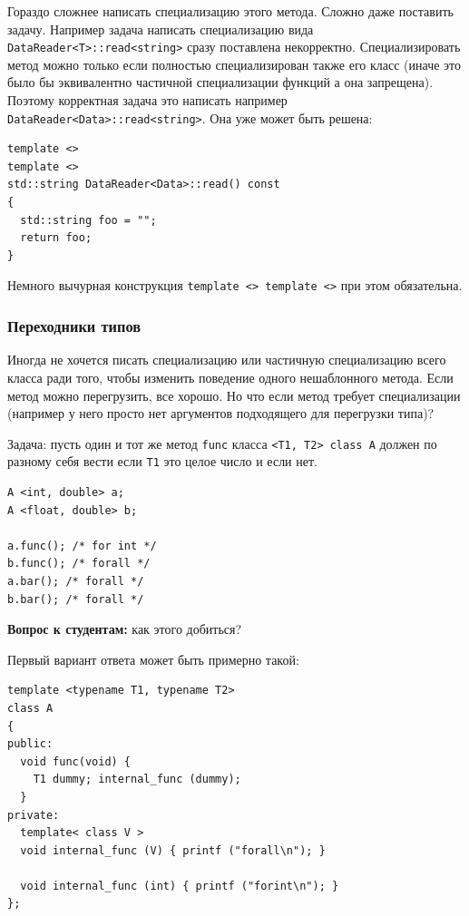 \documentclass[a4paper,12pt,oneside]{article}
\newif\ifanswers
\begin{document}
Гораздо сложнее написать специализацию этого метода. Сложно даже поставить задачу. Например задача написать специализацию вида \lstinline!DataReader<T>::read<string>! сразу поставлена некорректно. Специализировать метод можно только если полностью специализирован также его класс (иначе это было бы эквивалентно частичной специализации функций а она запрещена). Поэтому корректная задача это написать например \lstinline!DataReader<Data>::read<string>!. Она уже может быть решена:

\begin{lstlisting}
template <> 
template <> 
std::string DataReader<Data>::read() const
{
  std::string foo = "";
  return foo;
}
\end{lstlisting}

Немного вычурная конструкция \lstinline!template <> template <>! при этом обязательна.

\subsubsection{Переходники типов}\label{TypeToTypes}

Иногда не хочется писать специализацию или частичную специализацию всего класса ради того, чтобы изменить поведение одного нешаблонного метода. Если метод можно перегрузить, все хорошо. Но что если метод требует специализации (например у него просто нет аргументов подходящего для перегрузки типа)? 

Задача: пусть один и тот же метод \lstinline!func! класса \lstinline!<T1, T2> class A! должен по разному себя вести если \lstinline!T1! это целое число и если нет.

\begin{lstlisting}
A <int, double> a;
A <float, double> b;

a.func(); /* for int */
b.func(); /* forall */
a.bar(); /* forall */
b.bar(); /* forall */
\end{lstlisting}

\textbf{Вопрос к студентам:} как этого добиться?

\ifanswers
См. верный ответ ниже (разумеется предполагается немного подумать самому).
\fi

Первый вариант ответа может быть примерно такой:

\begin{lstlisting}
template <typename T1, typename T2>
class A
{
public:
  void func(void) { 
    T1 dummy; internal_func (dummy); 
  }
private:
  template< class V >
  void internal_func (V) { printf ("forall\n"); }

  void internal_func (int) { printf ("forint\n"); }
};
\end{lstlisting}
\end{document}
